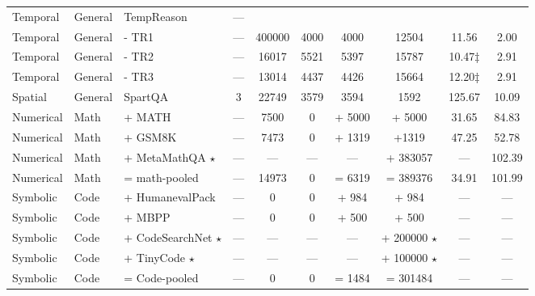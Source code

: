 \begin{table}[t!]
{\begin{tabular}{ l | l | l | c | c | c | c  c | c c }
    Temporal & General & TempReason \citep{tan2023towards}  & ---  &  &  &    & &  &    \\
    Temporal & General & \quad - TR1  & ---  & 400000 & 4000 & 4000 & 12504 & 11.56 & 2.00   \\
    Temporal & General & \quad - TR2  & ---  & 16017 & 5521 & 5397 & 15787 & \hspace{0.3em}10.47$\ddagger$ &2.91\\ 
    Temporal & General & \quad - TR3 & ---  & 13014 &  4437 & 4426 & 15664 & \hspace{0.3em}12.20$\ddagger$ &  2.91  \\ \midrule
    Spatial & General & SpartQA \citep{mirzaee2021spartqa}  &  3 & 22749 & 3579 & 3594 & 1592 & 125.67 & 10.09 \\
    \midrule
    Numerical & Math  & + MATH \citep{hendrycks2021measuring} & ---  & 7500 & 0 &  + 5000 & + 5000 & 31.65 & 84.83 \\
    Numerical & Math & + GSM8K \citep{cobbe2021training}  &  --- & 7473  & 0 & + 1319 & +1319 & 47.25 & 52.78\\ 
    Numerical & Math & + MetaMathQA \citep{yu2023metamath} $\star$  &  --- &---&---  &  ---  & + 383057 & --- &  102.39   \\ 
    Numerical & Math & = math-pooled  &  --- &14973 & 0 & = 6319& = 389376     & 34.91 & 101.99 \\ 
    \midrule
    Symbolic  & Code & + HumanevalPack \citep{muennighoff2023octopack}    &  --- & 0  &  0 & + 984 & + 984 & --- & --- \\ 
    Symbolic  & Code & + MBPP \citep{austin2021program}   &  --- &  0 &  0 & + 500  & + 500 & --- & --- \\ 
    Symbolic  & Code & + CodeSearchNet \citep{husain2019codesearchnet} $\star$  &  --- &  --- &  --- & ---  & + 200000 $\star$& --- & --- \\ 
    Symbolic  & Code & + TinyCode $\star$  &  --- &  --- & --- & ---  & + 100000 $\star$ & --- & --- \\ 
    Symbolic  & Code & = Code-pooled    &  --- &  0 & 0 & = 1484  & = 301484 & --- & --- \\ 
    \bottomrule
    \end{tabular}}
    \vspace{-2mm} 

\end{table}
